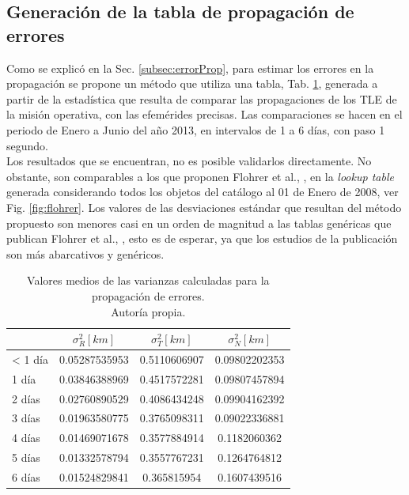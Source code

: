 \subsection*{Generaci\'on de la tabla de propagaci\'on de errores}

Como se explic\'o en la Sec. \ref{subsec:errorProp}, para estimar los errores en la propagaci\'on se propone un m\'etodo que utiliza una tabla, Tab. \ref{tab:resultatabla}, generada a partir de la estad\'istica que resulta de comparar las propagaciones de los TLE de la misi\'on operativa, con las efem\'erides precisas. Las comparaciones se hacen en el periodo de Enero a Junio del a\~no 2013, en intervalos de 1 a 6 d\'ias, con paso 1 segundo.\\
Los resultados que se encuentran, no es posible validarlos directamente. No obstante, son comparables a los que proponen Flohrer et al., \citep{flohrer2008assessment}, en la {\it{lookup table}} generada considerando todos los objetos del cat\'alogo al 01 de Enero de 2008, ver Fig. \ref{fig:flohrer}. Los valores de las desviaciones est\'andar que resultan del m\'etodo propuesto son menores casi en un orden de magnitud a las tablas gen\'ericas que publican Flohrer et al., \citep{flohrer2008assessment}, esto es de esperar, ya que los estudios de la publicaci\'on son m\'as abarcativos y gen\'ericos.\\

\begin{table}[!h]
\caption[Tabla con los valores medios para la propagaci\'on de errores.]{Valores medios de las varianzas calculadas para la propagaci\'on de errores.\\ Autor\'ia propia.}
\begin{tabular}{lccc}
\hline \hline
\rowcolor{yellow!35}
&$\sigma^{2}_R [km]$ &$\sigma^{2}_T [km]$ &$\sigma^{2}_N [km]$\\
\hline \hline
< 1 d\'ia & 0.05287535953&0.5110606907&0.09802202353\\
\hline
1 d\'ia & 0.03846388969&0.4517572281&0.09807457894\\
\hline
2 d\'ias & 0.02760890529&0.4086434248&0.09904162392\\
\hline
3 d\'ias & 0.01963580775&0.3765098311&0.09022336881\\
\hline
4 d\'ias & 0.01469071678&0.3577884914&0.1182060362\\
\hline
5 d\'ias & 0.01332578794&0.3557767231&0.1264764812\\
\hline
6 d\'ias & 0.01524829841&0.365815954&0.1607439516\\
\hline
\end{tabular}
\label{tab:resultatabla}
\end{table}

